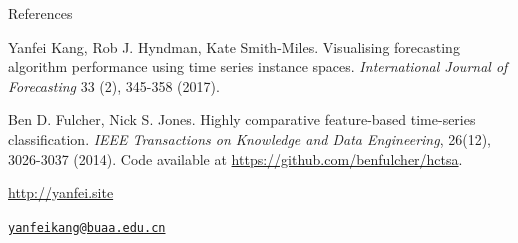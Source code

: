 \documentclass[12pt,ignorenonframetext,compress]{beamer}
\begin{document}
\begin{frame}{References}

Yanfei Kang, Rob J. Hyndman, Kate Smith-Miles. Visualising forecasting
algorithm performance using time series instance spaces.
\emph{International Journal of Forecasting} 33 (2), 345-358 (2017).

Ben D. Fulcher, Nick S. Jones. Highly comparative feature-based
time-series classification. \emph{IEEE Transactions on Knowledge and
Data Engineering}, 26(12), 3026-3037 (2014). Code available at
\url{https://github.com/benfulcher/hctsa}.

\Large \url{http://yanfei.site}

\Large \href{mailto:yanfeikang@buaa.edu.cn}{\nolinkurl{yanfeikang@buaa.edu.cn}}

\end{frame}
\end{document}
